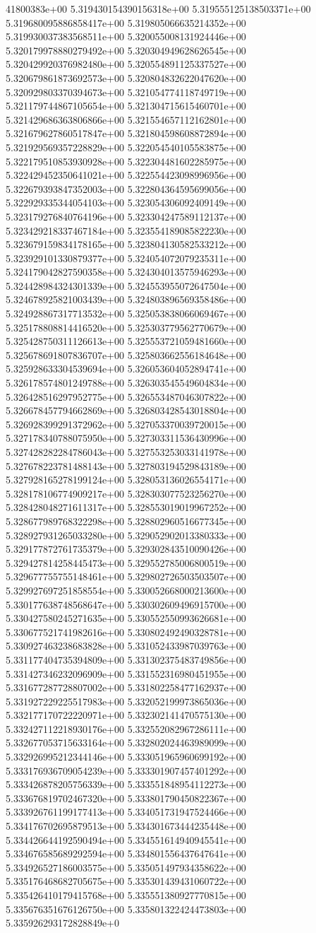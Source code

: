 41800383e+00	5.319430154390156318e+00	5.319555125138503371e+00	5.319680095886858417e+00	5.319805066635214352e+00	5.319930037383568511e+00	5.320055008131924446e+00	5.320179978880279492e+00	5.320304949628626545e+00	5.320429920376982480e+00	5.320554891125337527e+00	5.320679861873692573e+00	5.320804832622047620e+00	5.320929803370394673e+00	5.321054774118749719e+00	5.321179744867105654e+00	5.321304715615460701e+00	5.321429686363806866e+00	5.321554657112162801e+00	5.321679627860517847e+00	5.321804598608872894e+00	5.321929569357228829e+00	5.322054540105583875e+00	5.322179510853930928e+00	5.322304481602285975e+00	5.322429452350641021e+00	5.322554423098996956e+00	5.322679393847352003e+00	5.322804364595699056e+00	5.322929335344054103e+00	5.323054306092409149e+00	5.323179276840764196e+00	5.323304247589112137e+00	5.323429218337467184e+00	5.323554189085822230e+00	5.323679159834178165e+00	5.323804130582533212e+00	5.323929101330879377e+00	5.324054072079235311e+00	5.324179042827590358e+00	5.324304013575946293e+00	5.324428984324301339e+00	5.324553955072647504e+00	5.324678925821003439e+00	5.324803896569358486e+00	5.324928867317713532e+00	5.325053838066069467e+00	5.325178808814416520e+00	5.325303779562770679e+00	5.325428750311126613e+00	5.325553721059481660e+00	5.325678691807836707e+00	5.325803662556184648e+00	5.325928633304539694e+00	5.326053604052894741e+00	5.326178574801249788e+00	5.326303545549604834e+00	5.326428516297952775e+00	5.326553487046307822e+00	5.326678457794662869e+00	5.326803428543018804e+00	5.326928399291372962e+00	5.327053370039720015e+00	5.327178340788075950e+00	5.327303311536430996e+00	5.327428282284786043e+00	5.327553253033141978e+00	5.327678223781488143e+00	5.327803194529843189e+00	5.327928165278199124e+00	5.328053136026554171e+00	5.328178106774909217e+00	5.328303077523256270e+00	5.328428048271611317e+00	5.328553019019967252e+00	5.328677989768322298e+00	5.328802960516677345e+00	5.328927931265033280e+00	5.329052902013380333e+00	5.329177872761735379e+00	5.329302843510090426e+00	5.329427814258445473e+00	5.329552785006800519e+00	5.329677755755148461e+00	5.329802726503503507e+00	5.329927697251858554e+00	5.330052668000213600e+00	5.330177638748568647e+00	5.330302609496915700e+00	5.330427580245271635e+00	5.330552550993626681e+00	5.330677521741982616e+00	5.330802492490328781e+00	5.330927463238683828e+00	5.331052433987039763e+00	5.331177404735394809e+00	5.331302375483749856e+00	5.331427346232096909e+00	5.331552316980451955e+00	5.331677287728807002e+00	5.331802258477162937e+00	5.331927229225517983e+00	5.332052199973865036e+00	5.332177170722220971e+00	5.332302141470575130e+00	5.332427112218930176e+00	5.332552082967286111e+00	5.332677053715633164e+00	5.332802024463989099e+00	5.332926995212344146e+00	5.333051965960699192e+00	5.333176936709054239e+00	5.333301907457401292e+00	5.333426878205756339e+00	5.333551848954112273e+00	5.333676819702467320e+00	5.333801790450822367e+00	5.333926761199177413e+00	5.334051731947524466e+00	5.334176702695879513e+00	5.334301673444235448e+00	5.334426644192590494e+00	5.334551614940945541e+00	5.334676585689292594e+00	5.334801556437647641e+00	5.334926527186003575e+00	5.335051497934358622e+00	5.335176468682705675e+00	5.335301439431060722e+00	5.335426410179415768e+00	5.335551380927770815e+00	5.335676351676126750e+00	5.335801322424473803e+00	5.335926293172828849e+0